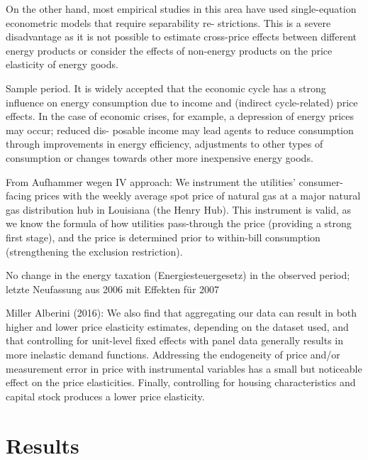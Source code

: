 \documentclass[12pt,twoside]{reedthesis}
\begin{document}
On the other hand, most empirical studies in this area have used single-equation econometric models that require separability re- strictions. This is a severe disadvantage as it is not possible to estimate cross-price effects between different energy products or consider the effects of non-energy products on the price elasticity of energy goods.

Sample period. It is widely accepted that the economic cycle has a strong influence on energy consumption due to income and (indirect cycle-related) price effects. In the case of economic crises, for example, a depression of energy prices may occur; reduced dis- posable income may lead agents to reduce consumption through improvements in energy efficiency, adjustments to other types of consumption or changes towards other more inexpensive energy goods.

From Aufhammer wegen IV approach:
We instrument the utilities' consumer-facing prices with the weekly average spot price of natural gas at a major natural gas distribution hub in Louisiana (the Henry Hub). This instrument is valid, as we know the formula of how utilities pass-through the price (providing a strong first stage), and the price is determined prior to within-bill consumption (strengthening the exclusion restriction).

No change in the energy taxation (Energiesteuergesetz) in the observed period; letzte Neufassung aus 2006 mit Effekten für 2007

Miller Alberini (2016):
We also find that aggregating our data can result in both higher and lower price elasticity estimates, depending on the dataset used, and that controlling for unit-level fixed effects with panel data generally results in more inelastic demand functions. Addressing the endogeneity of price and/or measurement error in price with instrumental variables has a small but noticeable effect on the price elasticities. Finally, controlling for housing characteristics and capital stock produces a lower price elasticity.

\hypertarget{results}{%
\chapter{Results}\label{results}}
\end{document}
